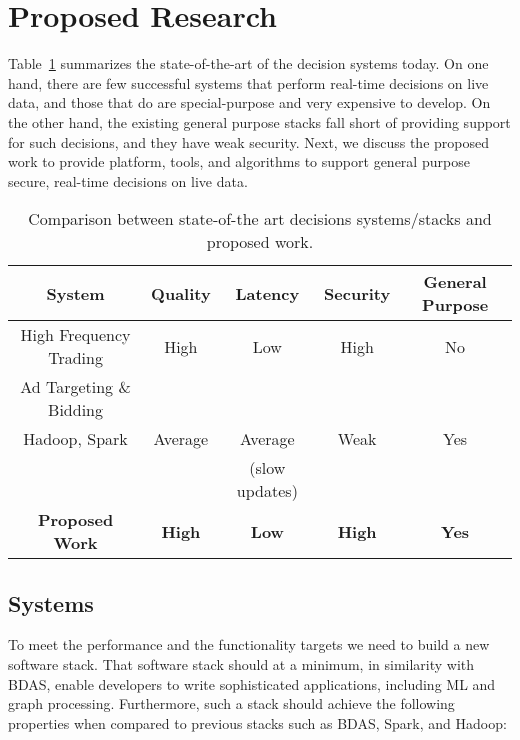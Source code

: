 \section{Proposed Research}

Table~\ref{table:new-work} summarizes the state-of-the-art of the decision systems today. On one hand, there are few successful systems that perform real-time decisions on live data, and those that do are special-purpose and very expensive to develop. On the other hand, the existing general purpose stacks fall short of providing support for such decisions, and they have weak security. Next, we discuss the proposed work to provide platform, tools, and algorithms to support general purpose secure, real-time decisions on live data.  


\begin{table}[h]
\begin{center}
{\small
\begin{tabular}{ |c|c|c|c|c| } 
 \hline
{\bf System} & {\bf Quality} & {\bf Latency} & {\bf Security} & {\bf General Purpose}\\\hline 
High Frequency Trading & High & Low & High & No \\
Ad Targeting \& Bidding & & & & \\\hline
Hadoop, Spark & Average & Average & Weak & Yes\\
                         &               & (slow updates) & & \\\hline
{\bf Proposed Work} & {\bf High} & {\bf Low} & {\bf High} & {\bf Yes} \\\hline
\end{tabular}
}
\end{center}
\vskip -0.15in
\caption{\small{Comparison between state-of-the art decisions systems/stacks and proposed work.}}
\label{table:new-work}
\end{table}


\subsection{Systems}

To meet the performance and the functionality targets we need to build a new software stack. That software stack should at a minimum, in similarity with BDAS, enable developers to write sophisticated applications, including ML and graph processing. Furthermore, such a stack should achieve the following properties when compared to previous stacks such as BDAS, Spark, and Hadoop:

